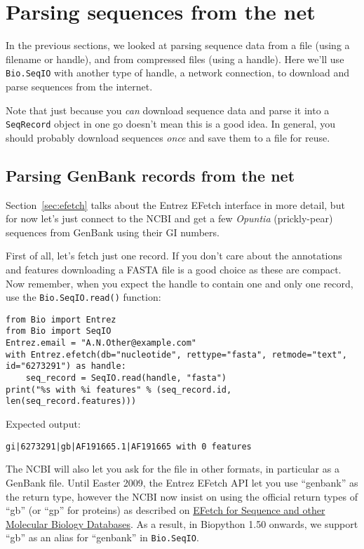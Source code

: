 \section{Parsing sequences from the net}
\label{sec:SeqIO_Online}
In the previous sections, we looked at parsing sequence data from a file
(using a filename or handle), and from compressed files (using a handle).
Here we'll use \verb|Bio.SeqIO| with another type of handle, a network
connection, to download and parse sequences from the internet.

Note that just because you \emph{can} download sequence data and parse it into
a \verb|SeqRecord| object in one go doesn't mean this is a good idea.
In general, you should probably download sequences \emph{once} and save them to
a file for reuse.

\subsection{Parsing GenBank records from the net}
\label{sec:SeqIO_GenBank_Online}
Section~\ref{sec:efetch} talks about the Entrez EFetch interface in more detail,
but for now let's just connect to the NCBI and get a few \textit{Opuntia} (prickly-pear)
sequences from GenBank using their GI numbers.

First of all, let's fetch just one record.  If you don't care about the
annotations and features downloading a FASTA file is a good choice as these
are compact.  Now remember, when you expect the handle to contain one and
only one record, use the \verb|Bio.SeqIO.read()| function:

\begin{verbatim}
from Bio import Entrez
from Bio import SeqIO
Entrez.email = "A.N.Other@example.com"
with Entrez.efetch(db="nucleotide", rettype="fasta", retmode="text", id="6273291") as handle:
    seq_record = SeqIO.read(handle, "fasta")
print("%s with %i features" % (seq_record.id, len(seq_record.features)))
\end{verbatim}

\noindent Expected output:

\begin{verbatim}
gi|6273291|gb|AF191665.1|AF191665 with 0 features
\end{verbatim}

The NCBI will also let you ask for the file in other formats, in particular as
a GenBank file. Until Easter 2009, the Entrez EFetch API let you use ``genbank''
as the return type, however the NCBI now insist on using the official
return types of ``gb'' (or ``gp'' for proteins) as described on
\href{https://www.ncbi.nlm.nih.gov/books/NBK3837/}
{EFetch for Sequence and other Molecular Biology Databases}.
As a result, in Biopython 1.50 onwards, we support ``gb'' as an
alias for ``genbank'' in \verb|Bio.SeqIO|.

